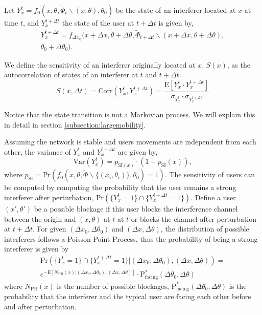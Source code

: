 \documentclass[10pt, conference, letterpaper]{IEEEtran}
\begin{document}
Let $Y_x^t=f_0(x, \theta, \tilde{\Phi}_t\backslash (x, \theta), \theta_0)$ be the state of an interferer located at $x$ at time $t$, and $Y_x^{t+\Delta t}$ the state of the user at $t+\Delta t$ is given by,
\begin{multline*}
Y_{x}^{t+\Delta t} = f_{\Delta x_0}(x+\Delta x, \theta + \Delta\theta, \tilde{\Phi}_{t+\Delta t}\backslash (x+\Delta x, \theta + \Delta\theta), \\
\theta_0 + \Delta\theta_0).
\end{multline*}

We define the sensitivity of an interferer originally located at $x$, $S(x)$, as the autocorrelation of states of an interferer at $t$ and $t+\Delta t$. 
\begin{equation}
S(x, \Delta t)
=\mathrm{Corr}(Y_x^t, Y_x^{t+\Delta t})
=\frac{\mathrm{E}[Y_x^t\cdot Y_x^{t + \Delta t}]}{\sigma_{Y_x^t}\cdot \sigma_{Y_x^{t+\Delta t}}}
\end{equation} 

Notice that the state transition is not a Markovian process. We will explain this in detail in section \ref{subsection:largemobility}.

Assuming the network is stable and users movements are independent from each other, the variance of $Y_x^t$ and $Y_x^{t+\Delta t}$ are given by,
\begin{equation*}
\mathrm{Var}(Y_x^t)=p_{\mathrm{SI}(x)}\cdot (1-p_{\mathrm{SI}}(x)),
\end{equation*}
where $p_{\mathrm{SI}}=\mathrm{Pr}(f_0(x,\theta,\tilde{\Phi}\backslash\{(x_i,\theta_i)\}, \theta_0)=1)$. 
The sensitivity of users can be computed by computing the probability that the user remains a strong interferer after perturbation, $\mathrm{Pr}(\{Y_x^t=1\}\cap \{Y_x^{t+\Delta t}=1\})$. Define a user $(x',\theta')$ be a possible blockage if this user blocks the interference channel between the origin and $(x,\theta)$ at $t$ at $t$ or blocks the channel after perturbation at $t+\Delta t$. For given $(\Delta x_0, \Delta\theta_0)$ and $(\Delta x, \Delta\theta)$, the distribution of possible interferers follows a Poisson Point Process, thus the probability of being a strong interferer is given by
\begin{multline}
\mathrm{Pr}(\{Y_x^t=1\}\cap \{Y_x^{t+\Delta t}=1\}|(\Delta x_0, \Delta \theta_0), (\Delta x, \Delta\theta))=\\
e^{-\mathrm{E}[N_{\mathrm{PB}}(x)|(\Delta x_0, \Delta \theta_0), (\Delta x, \Delta\theta)]}\cdot
\mathrm{P}_{\mathrm{facing}}^{\ast}(\Delta \theta_0, \Delta\theta)
\end{multline}
where $N_{\mathrm{PB}}(x)$ is the number of possible blockages, $\mathrm{P}_{\mathrm{facing}}^{\ast}(\Delta \theta_0, \Delta\theta)$ is the probability that the interferer and the typical user are facing each other before and after perturbation. 
\end{document}
